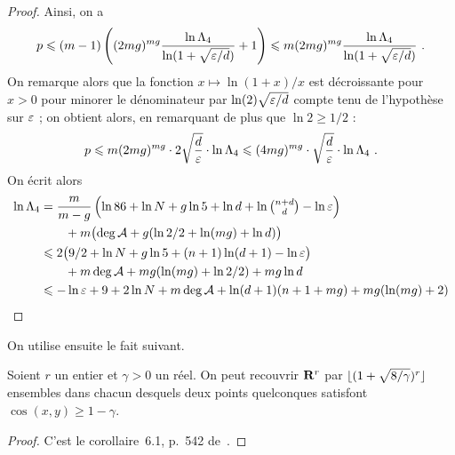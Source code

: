 \begin{proof}
  Ainsi, on a
  \begin{equation}
    p
    \leqslant
    (m - 1)
    \left(
      (2mg)^{mg}
      \frac{ \ln \Lambda_4 }{ \ln (1 + \sqrt{\varepsilon / d}) }
      + 1
    \right)
    \leqslant
    m
    (2mg)^{mg}
    \frac{ \ln \Lambda_4 }{ \ln (1 + \sqrt{\varepsilon / d}) }
    \text{ .}
  \end{equation}
  On remarque alors que la fonction \( x \mapsto \ln(1+x)/x \) est
  décroissante pour \( x > 0 \) pour minorer le dénominateur par \( \ln(2)
    \sqrt{\varepsilon / d} \) compte tenu de l'hypothèse sur \( \varepsilon \) ; on
  obtient alors, en remarquant de plus que \( \ln 2 \ge 1/2 \) :
  \begin{equation}
    p
    \leqslant
    m (2mg)^{mg}
    \cdot 2 \sqrt{\frac d {\varepsilon}}
    \cdot \ln \Lambda_4
    \leqslant
    (4mg)^{mg}
    \cdot \sqrt{\frac d {\varepsilon}}
    \cdot \ln \Lambda_4
    \text{ .}
  \end{equation}
  On écrit alors
  \begin{align}
    \ln \Lambda_4
    & =
    \frac{m}{m-g}
    \left(
      \ln 86
      + \ln N
      + g \ln 5
      + \ln d
      + {\textstyle \ln \binom{n+d}d}
      - \ln \varepsilon
    \right)
    \\ & \qquad
    + m \bigl(
      \deg\mathcal A + g (\ln2/2 + \ln(mg) + \ln d)
    \bigr)
    \\ & \leqslant
    2 \bigl(
      9/2
      + \ln N
      + g \ln 5
      + (n+1) \ln(d+1)
      - \ln \varepsilon
    \bigr)
    \\ & \qquad
    + m \deg\mathcal A
    + mg (\ln(mg) + \ln2/2)
    + mg \ln d
    \\ & \leqslant
    - \ln \varepsilon
    + 9
    + 2 \ln N
    + m \deg\mathcal A
    + \ln(d+1) (n+1 + mg)
    + mg (\ln(mg) + 2)
  \end{align}
\end{proof}

On utilise ensuite le fait suivant.

\begin{fact}
  Soient \( r \) un entier et \( \gamma > 0 \) un réel. On peut recouvrir \(
    {\mathbf{R}}^r \) par \( \lfloor(1 + \sqrt{8/\gamma})^r\rfloor \) ensembles dans chacun
  desquels deux points quelconques satisfont \( \cos(x, y) \ge 1 - \gamma \).
\end{fact}

\begin{proof}
  C'est le corollaire~6.1, p.~542 de~\cite{remdcl}.
\end{proof}

